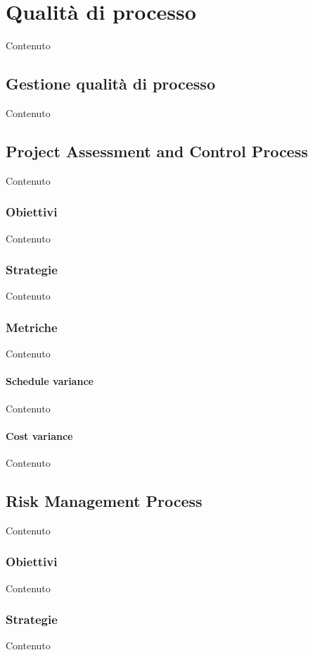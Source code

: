 \section{Qualit\`a di processo}\label{QualitaProcesso}
Contenuto

    \subsection{Gestione qualit\`a di processo}
    Contenuto


    \subsection{Project Assessment and Control Process}
    Contenuto
    
    \subsubsection{Obiettivi}
    Contenuto

    \subsubsection{Strategie}
    Contenuto


    \subsubsection{Metriche}
    Contenuto

    \paragraph{Schedule variance}
    Contenuto

    \paragraph{Cost variance}
    Contenuto


    \subsection{Risk Management Process}
    Contenuto

    \subsubsection{Obiettivi}
    Contenuto

    \subsubsection{Strategie}
    Contenuto


